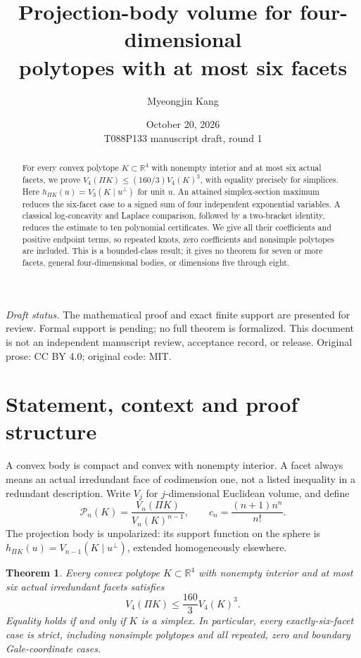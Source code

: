 \documentclass[11pt]{article}
\title{Projection-body volume for four-dimensional\\polytopes with at most six facets}
\author{Myeongjin Kang}
\date{October 20, 2026\\\small T088P133 manuscript draft, round 1}
\newtheorem{theorem}{Theorem}
\theoremstyle{remark}\newtheorem{remark}[theorem]{Remark}
\newcommand{\R}{\mathbb R}
\newcommand{\PP}{\mathcal P}
\numberwithin{equation}{section}
\begin{document}
\maketitle
\begin{abstract}
For every convex polytope $K\subset\R^4$ with nonempty interior and at
most six actual facets, we prove
$V_4(\Pi K)\le (160/3)V_4(K)^3$, with equality precisely for simplices.
Here $h_{\Pi K}(u)=V_3(K\mid u^\perp)$ for unit $u$.
An attained simplex-section maximum reduces the six-facet case to a
signed sum of four independent exponential variables. A classical
log-concavity and Laplace comparison, followed by a two-bracket
identity, reduces the estimate to ten polynomial certificates.
We give all their coefficients and positive endpoint terms, so repeated
knots, zero coefficients and nonsimple polytopes are included.
This is a bounded-class result; it gives no theorem for seven or more
facets, general four-dimensional bodies, or dimensions five through eight.
\end{abstract}
\noindent\textit{Draft status.} The mathematical proof and exact finite support
are presented for review. Formal support is pending; no full theorem is
formalized. This document is not an independent manuscript review,
acceptance record, or release. Original prose: CC BY 4.0; original code: MIT.

\section{Statement, context and proof structure}
A convex body is compact and convex with nonempty interior. A facet always
means an actual irredundant face of codimension one, not a listed inequality
in a redundant description. Write $V_j$ for $j$-dimensional Euclidean
volume, and define
\begin{equation}\label{eq:ratio}
 \PP_n(K)=\frac{V_n(\Pi K)}{V_n(K)^{n-1}},\qquad
 c_n=\frac{(n+1)n^n}{n!}.
\end{equation}
The projection body is unpolarized: its support function on the sphere is
$h_{\Pi K}(u)=V_{n-1}(K\mid u^\perp)$, extended homogeneously elsewhere.

\begin{theorem}\label{thm:main}
Every convex polytope $K\subset\R^4$ with nonempty interior and at most
six actual irredundant facets satisfies
\[
 V_4(\Pi K)\le \frac{160}{3}V_4(K)^3.
\]
Equality holds if and only if $K$ is a simplex. In particular, every
exactly-six-facet case is strict, including nonsimple polytopes and all
repeated, zero and boundary Gale-coordinate cases.
\end{theorem}
\end{document}
